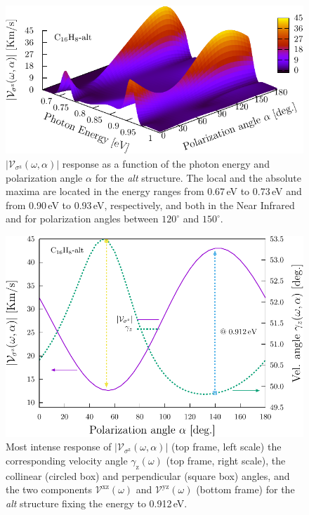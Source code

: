 \documentclass[prb,11pt,tightenlines,twocolumn,aps]{revtex4-1}
\begin{document}
\begin{figure}[tb]
    \centering
    \includegraphics[width=\linewidth]{altplots/alt-3d-svaz}
    \caption{$|\mathcal{V}_{\sigma^{\mathrm{z}}}(\omega,\alpha)|$ response
    as a function of the photon energy and polarization angle $\alpha$  for the
    \emph{alt} structure. The local and the absolute maxima are located in the
    energy ranges from 0.67\,eV to 0.73\,eV and from 0.90\,eV to 0.93\,eV,
    respectively, and both in the Near Infrared and for polarization angles
    between $120^{\circ}$ and $150^{\circ}$.}
    \label{fig:alt-3d-vsb}
\end{figure}

\begin{figure}[t]
    \centering
    \includegraphics[width=\linewidth]{altplots/alt-vaz-rag}
    \caption{Most intense response of
    $|\mathcal{V}_{\sigma^{\mathrm{z}}}(\omega,\alpha)|$ (top frame, left
    scale) the corresponding velocity angle $\gamma_{\mathrm{z}}(\omega)$ (top
    frame, right scale), the collinear (circled box) and perpendicular (square
    box) angles, and the two components $\mathcal{V}^{\mathrm{xz}}(\omega)$ and
    $\mathcal{V}^{\mathrm{yz}}(\omega)$ (bottom frame) for the \emph{alt}
    structure fixing the energy to 0.912\,eV.}
    \label{fig:alt-vaz-rag}
\end{figure}
\end{document}
